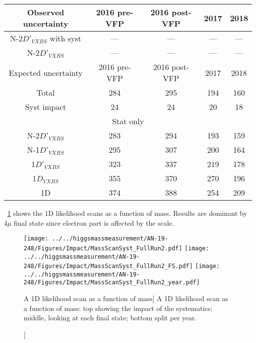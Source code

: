 \begin{table}[ht]	
\begin{center}
    \begin{tabular}{ccccc}
    \hline		
    Observed uncertainty	&	2016 pre-VFP	&	2016 post-VFP	&	2017	&	2018	\\
    \hline			
    N-2$D'_{VXBS}$ with syst	&	---	&	---	&	---	&	---\\
    N-2$D'_{VXBS}$	&	---	&	---	&	---	&	---\\
    \hline			
    \hline			
    Expected uncertainty	&	2016 pre-VFP	&	2016 post-VFP	&	2017	&	2018	\\
    \hline			
    Total	&	284	&	295	&	194	&	160	\\
    \hline			
    Syst impact	&	24	&	24	&	20	&	18	\\
    \hline
    \multicolumn{5}{c}{Stat only}\\
    \hline
    N-2$D'_{VXBS}$	&	283	&	294	&	193	&	159	\\
    N-1$D'_{VXBS}$	&	295	&	307	&	200	&	164	\\
    1$D'_{VXBS}$	&	323	&	337	&	219	&	178	\\
    1$D_{VXBS}$		&	355	&	370	&	270	&	196	\\
    1D				&	374	&	388	&	254	&	209	\\
    \hline			
    \end{tabular}
    \label{table:2D_refit_result_finals_year}
\end{center}
\end{table}
\figurename~\ref{mass_scan} shows the 1D likelihood scans as a function of mass.
Results are dominant by 4$\mu$ final state since electron part is affected by the scale.
\begin{figure}[!htbp]
\begin{center}
	\texttt{[image: ../../higgsmassmeasurement/AN-19-248/Figures/Impact/MassScanSyst\_FullRun2.pdf]}
	\texttt{[image: ../../higgsmassmeasurement/AN-19-248/Figures/Impact/MassScanSyst\_FullRun2\_FS.pdf]}
	\texttt{[image: ../../higgsmassmeasurement/AN-19-248/Figures/Impact/MassScanSyst\_FullRun2\_year.pdf]}
	\caption
        [A 1D likelihood scan as a function of mass]
        {A 1D likelihood scan as a function of mass: top showing the impact of the systematics;
        middle, looking at each final state; bottom split per year.}
	\label{mass_scan}
\end{center}
\end{figure}

